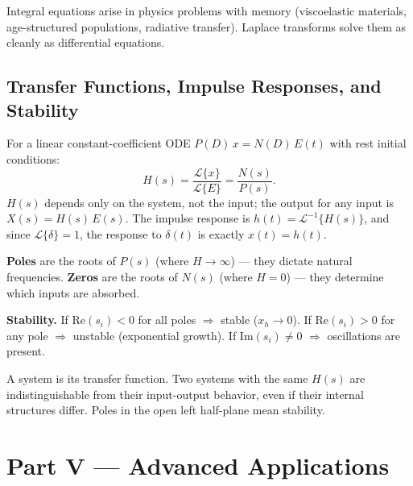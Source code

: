 \documentclass[11pt]{article}
\begin{document}
\begin{conceptbox}
Integral equations arise in physics problems with \textcolor{accentorange}{memory} (viscoelastic materials, age-structured populations, radiative transfer). Laplace transforms solve them as cleanly as differential equations.
\end{conceptbox}

\subsection{Transfer Functions, Impulse Responses, and Stability}

\begin{formulabox}
For a linear constant-coefficient ODE $P(D)\,x = N(D)\,E(t)$ with rest initial conditions:
\[ H(s) = \frac{\mathcal{L}\{x\}}{\mathcal{L}\{E\}} = \frac{N(s)}{P(s)}. \]
$H(s)$ depends only on the system, not the input; the output for any input is $X(s) = H(s)\,E(s)$. The impulse response is $h(t) = \mathcal{L}^{-1}\{H(s)\}$, and since $\mathcal{L}\{\delta\}=1$, the response to $\delta(t)$ is exactly $x(t) = h(t)$.
\end{formulabox}

\begin{methodbox}
\textbf{Poles} are the roots of $P(s)$ (where $H \to \infty$) --- they dictate natural frequencies. \textbf{Zeros} are the roots of $N(s)$ (where $H = 0$) --- they determine which inputs are absorbed.

\smallskip
\textbf{Stability.} If $\mathrm{Re}(s_i) < 0$ for all poles $\Rightarrow$ stable ($x_h \to 0$). If $\mathrm{Re}(s_i) > 0$ for any pole $\Rightarrow$ unstable (exponential growth). If $\mathrm{Im}(s_i) \ne 0$ $\Rightarrow$ oscillations are present.
\end{methodbox}

\begin{conceptbox}
\textcolor{accentorange}{A system is its transfer function.} Two systems with the same $H(s)$ are indistinguishable from their input-output behavior, even if their internal structures differ. Poles in the open left half-plane mean stability.
\end{conceptbox}

\clearpage
{}
{}
\section*{Part V --- Advanced Applications}
\setcounter{section}{5}
\setcounter{subsection}{0}
\end{document}
